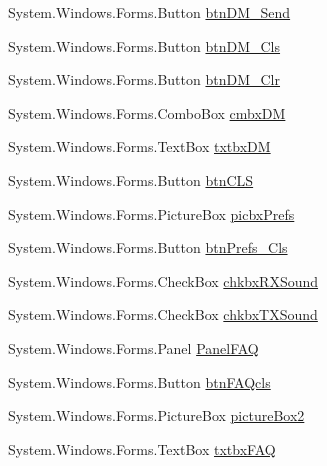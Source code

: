 \begin{DoxyCompactItemize}
\-System.\-Windows.\-Forms.\-Button \hyperlink{class_sr_p___classroom_inq_1_1frm_classrrom_inq_a5633d72d43c108b34eb912acdcc81878}{btn\-D\-M\-\_\-\-Send}
\item 
\-System.\-Windows.\-Forms.\-Button \hyperlink{class_sr_p___classroom_inq_1_1frm_classrrom_inq_a2e01fdc50400702fd6df6d5d785ddb4d}{btn\-D\-M\-\_\-\-Cls}
\item 
\-System.\-Windows.\-Forms.\-Button \hyperlink{class_sr_p___classroom_inq_1_1frm_classrrom_inq_a81852ce0a99da9e3b5838befcb9daedc}{btn\-D\-M\-\_\-\-Clr}
\item 
\-System.\-Windows.\-Forms.\-Combo\-Box \hyperlink{class_sr_p___classroom_inq_1_1frm_classrrom_inq_a3d1c3cd1ef0f02e6e927a4fd741672e5}{cmbx\-D\-M}
\item 
\-System.\-Windows.\-Forms.\-Text\-Box \hyperlink{class_sr_p___classroom_inq_1_1frm_classrrom_inq_aec9084c69e8f5c7398f201a074db8550}{txtbx\-D\-M}
\item 
\-System.\-Windows.\-Forms.\-Button \hyperlink{class_sr_p___classroom_inq_1_1frm_classrrom_inq_a750ba6df4c36e55bb0b4211c0915d63c}{btn\-C\-L\-S}
\item 
\-System.\-Windows.\-Forms.\-Picture\-Box \hyperlink{class_sr_p___classroom_inq_1_1frm_classrrom_inq_ad71fe1b1dd90eb59594ecf4a175e1b03}{picbx\-Prefs}
\item 
\-System.\-Windows.\-Forms.\-Button \hyperlink{class_sr_p___classroom_inq_1_1frm_classrrom_inq_ab11e101a873395b24e8894ac84d7d318}{btn\-Prefs\-\_\-\-Cls}
\item 
\-System.\-Windows.\-Forms.\-Check\-Box \hyperlink{class_sr_p___classroom_inq_1_1frm_classrrom_inq_af7626aaecde3bb58d5cfee3957410aa8}{chkbx\-R\-X\-Sound}
\item 
\-System.\-Windows.\-Forms.\-Check\-Box \hyperlink{class_sr_p___classroom_inq_1_1frm_classrrom_inq_a63062a732e40b85f40aa3ba57d80223a}{chkbx\-T\-X\-Sound}
\item 
\-System.\-Windows.\-Forms.\-Panel \hyperlink{class_sr_p___classroom_inq_1_1frm_classrrom_inq_ae18ea5d89fce8227797626585e3e2a1a}{\-Panel\-F\-A\-Q}
\item 
\-System.\-Windows.\-Forms.\-Button \hyperlink{class_sr_p___classroom_inq_1_1frm_classrrom_inq_a1c53d39fe22e25d8c00aa7d8c97eb9a8}{btn\-F\-A\-Qcls}
\item 
\-System.\-Windows.\-Forms.\-Picture\-Box \hyperlink{class_sr_p___classroom_inq_1_1frm_classrrom_inq_aeb268a5866f810521414bd3fd047ca72}{picture\-Box2}
\item 
\-System.\-Windows.\-Forms.\-Text\-Box \hyperlink{class_sr_p___classroom_inq_1_1frm_classrrom_inq_a891afdbfba3ee4c1b690b938693ecabe}{txtbx\-F\-A\-Q}

\end{DoxyCompactItemize}
